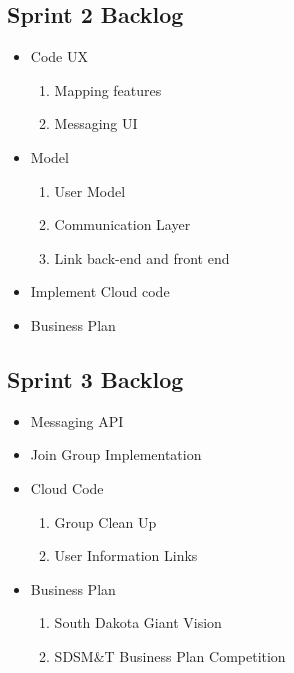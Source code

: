 \subsection{Sprint 2 Backlog}

	\begin{itemize}
	\item Code UX
		\begin{enumerate}
		\item Mapping features
		\item Messaging UI
		\end{enumerate}
	\item Model
		\begin{enumerate}
		\item User Model
		\item Communication Layer
		\item Link back-end and front end
		\end{enumerate}
	\item Implement Cloud code
	\item Business Plan

	\end{itemize}
\subsection{Sprint 3 Backlog}
\begin{itemize}
	\item Messaging API
	\item Join Group Implementation
	\item Cloud Code
	\begin{enumerate}
	\item Group Clean Up
	\item User Information Links
	\end{enumerate}
	\item Business Plan
	\begin{enumerate}
	\item South Dakota Giant Vision
	\item SDSM\&T Business Plan Competition
	\end{enumerate}
\end{itemize}


